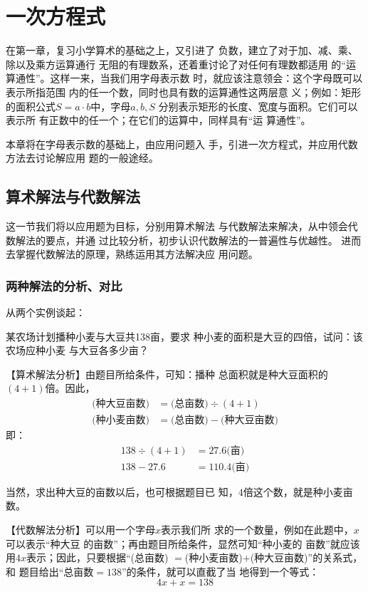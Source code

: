 \chapter{一次方程式}


    在第一章，复习小学算术的基础之上，又引进了
负数，建立了对于加、减、乘、除以及乘方运算通行
无阻的有理数系，还着重讨论了对任何有理数都适用
的“运算通性”。这样一来，当我们用字母表示数
时，就应该注意领会：这个字母既可以表示所指范围
内的任一个数，同时也具有数的运算通性这两层意
义；例如：矩形的面积公式$S=a\cdot b$中，字母$a,  b,  S$
分别表示矩形的长度、宽度与面积。它们可以表示所
有正数中的任一个；在它们的运算中，同样具有“运
算通性”。

    本章将在字母表示数的基础上，由应用问题入
手，引进一次方程式，并应用代数方法去讨论解应用
题的一般途经。

\section{算术解法与代数解法}
    这一节我们将以应用题为目标，分别用算术解法
与代数解法来解决，从中领会代数解法的要点，并通
过比较分析，初步认识代数解法的一普遍性与优越性。
进而去掌握代数解法的原理，熟练运用其方法解决应
用问题。

\subsection{两种解法的分析、对比}
从两个实例谈起：

\begin{example}
    某农场计划播种小麦与大豆共138亩，要求
种小麦的面积是大豆的四倍，试问：该农场应种小麦
与大豆各多少亩？
\end{example}

【算术解法分析】由题目所给条件，可知：播种
总面积就是种大豆面积的$(4 + 1)$倍。因此，
\[\begin{split}
    \text{(种大豆亩数)}&=\text{(总亩数)}\div (4 + 1)\\
    \text{(种小麦亩数)}&=\text{(总亩数)}-\text{(种大豆亩数)}
\end{split}\]
即：
\begin{align*}
    138\div(4 + 1)&=27.6\text{(亩)}\tag{大豆亩数}\\
    138-27. 6 &= 110.4\text{(亩)}\tag{小麦亩数}
\end{align*}

当然，求出种大豆的亩数以后，也可根据题目已
知，4倍这个数，就是种小麦亩数。

【代数解法分析】可以用一个字母$x$表示我们所
求的一个数量，例如在此题中，$x$可以表示“种大豆
的亩数”；再由题目所给条件，显然可知“种小麦的
亩数”就应该用$4x$表示；因此，只要根据“(总亩数)
$=$(种小麦亩数)$+$(种大豆亩数)”的关系式，和
题目给出“总亩数$=138$”的条件，就可以直截了当
地得到一个等式：
\[4x+x=138\]    

